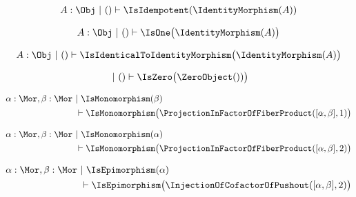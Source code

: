 \begin{sequent}
\begin{align*}
  A:\Obj ~|~ () \vdash \IsIdempotent( \IdentityMorphism( A ) )
\end{align*}
\end{sequent}

\begin{sequent}
 \begin{align*}
  A:\Obj ~|~ () \vdash \IsOne\big( \IdentityMorphism( A ) \big)
 \end{align*}
\end{sequent}

\begin{sequent}
 \begin{align*}
  A:\Obj ~|~ () \vdash \IsIdenticalToIdentityMorphism\big( \IdentityMorphism( A ) \big)
 \end{align*}
\end{sequent}

\begin{sequent}
 \begin{align*}
   ~|~ () \vdash \IsZero\big( \ZeroObject() ) \big)
 \end{align*}
\end{sequent}

\begin{sequent}
\begin{align*}
  \alpha:\Mor, \beta:\Mor  ~&|~ \IsMonomorphism( \beta ) \\
  &\vdash \IsMonomorphism\big( \ProjectionInFactorOfFiberProduct( [\alpha, \beta], 1 ) \big)
\end{align*}
\end{sequent}

\begin{sequent}
\begin{align*}
  \alpha:\Mor, \beta:\Mor ~&|~ \IsMonomorphism( \alpha ) \\
  &\vdash \IsMonomorphism\big( \ProjectionInFactorOfFiberProduct( [\alpha, \beta], 2 ) \big)
\end{align*}
\end{sequent}

\begin{sequent}
\begin{align*}
  \alpha:\Mor, \beta:\Mor ~&|~ \IsEpimorphism( \alpha ) \\
  &\vdash \IsEpimorphism\big( \InjectionOfCofactorOfPushout( [\alpha, \beta], 2 ) \big)
\end{align*}
\end{sequent}


